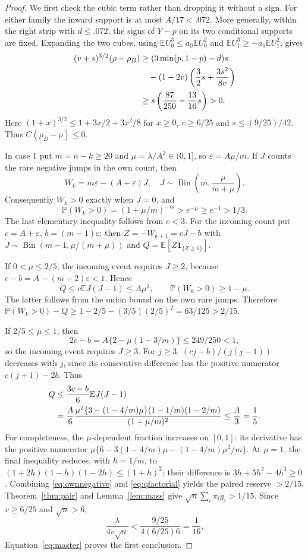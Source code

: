 \documentclass[11pt,a4paper]{article}
\newcommand{\E}{\mathbb E}\newcommand{\Pp}{\mathbb P}
\begin{document}
\begin{proof}
We first check the cubic term rather than dropping it without a sign.
For either family the inward support is at most $A/17<.072$. More generally,
within the right strip with $d\le.072$, the signs of $Y-p$ on its two
conditional supports are fixed. Expanding the two cubes, using
$\E U_0^3\le a_0\E U_0^2$ and $\E U_1^3\ge-a_1\E U_1^2$, gives
\begin{align*}
 (v+s)^{3/2}(\rho-\rho_B)
 &\ge (3\min(p,1-p)-d)s\notag\\
 &\quad-(1-2v)\left(\frac32s+\frac{3s^2}{8v}\right)\\
 &\ge s\left(\frac{87}{250}-\frac{13}{16}s\right)>0.
\end{align*}
Here $(1+x)^{3/2}\le1+3x/2+3x^2/8$ for $x\ge0$,
$v\ge6/25$ and $s\le(9/25)/42$. Thus $C(\rho_B-\rho)\le0$.

In case 1 put $m=n-k\ge20$ and $\mu=\lambda/A^2\in(0,1]$, so
$\varepsilon=A\mu/m$. If $J$ counts the rare negative jumps in the own
count, then
\[
 W_k=m\varepsilon-(A+\varepsilon)J,
 \quad J\sim\operatorname{Bin}\left(m,\frac\mu{m+\mu}\right).
\]
Consequently $W_k>0$ exactly when $J=0$, and
\begin{equation}\label{eq:ownnegative}
 \Pp(W_k>0)=(1+\mu/m)^{-m}>e^{-\mu}\ge e^{-1}>1/3.
\end{equation}
The last elementary inequality follows from $e<3$.
For the incoming count put $c=A+\varepsilon$, $b=(m-1)\varepsilon$;
then $Z=-W_{k+1}=cJ-b$ with
$J\sim\operatorname{Bin}(m-1,\mu/(m+\mu))$ and
$Q=\E[Z\mathbf1_{\{Z\ge1\}}]$.

If $0<\mu\le2/5$, the incoming event requires $J\ge2$, because
$c-b=A-(m-2)\varepsilon<1$. Hence
\[
 Q\le c\E J(J-1)\le A\mu^2,
 \qquad \Pp(W_k>0)\ge1-\mu.
\]
The latter follows from the union bound on the own rare jumps. Therefore
$\Pp(W_k>0)-Q\ge1-2/5-(3/5)(2/5)^2=63/125>2/15$.

If $2/5\le\mu\le1$, then
\[
 2c-b=A\{2-\mu(1-3/m)\}\le249/250<1,
\]
so the incoming event requires $J\ge3$. For $j\ge3$,
$(cj-b)/(j(j-1))$ decreases with $j$, since its consecutive difference
has the positive numerator $c(j+1)-2b$. Thus
\begin{align}\label{eq:qfactorial}
 Q&\le\frac{3c-b}{6}\E J(J-1)\notag\\
  &=\frac A6\frac{\mu^2\{3-(1-4/m)\mu\}(1-1/m)(1-2/m)}{(1+\mu/m)^2}
  \le\frac A3=\frac15.
\end{align}
For completeness, the $\mu$-dependent fraction increases on $[0,1]$:
its derivative has the positive numerator
$\mu\{6-3(1-4/m)\mu-(1-4/m)\mu^2/m\}$.
At $\mu=1$, the final inequality reduces, with $h=1/m$, to
$(1+2h)(1-h)(1-2h)\le(1+h)^2$; their difference is
$3h+5h^2-4h^3\ge0$. Combining \eqref{eq:ownnegative} and
\eqref{eq:qfactorial} yields the paired reserve $>2/15$.
Theorem~\ref{thm:pair} and Lemma~\ref{lem:mass} give
$\sqrt n\sum_i\pi_i g_i>1/15$.
Since $v\ge6/25$ and $\sqrt n>6$,
\[
 \frac\lambda{4v\sqrt n}<\frac{9/25}{4(6/25)6}=\frac1{16}.
\]
Equation~\eqref{eq:master} proves the first conclusion.


\end{proof}
\end{document}

